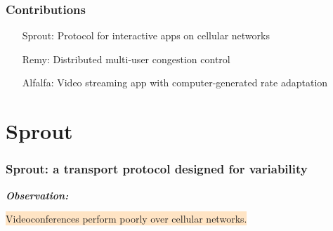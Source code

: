 \documentclass[svgnames]{beamer}
\begin{document}
\begin{frame}
\frametitle{Contributions}

\begin{itemize}

\item[Sprout:] Protocol for interactive apps on cellular networks


\item[]

\item[Remy:] Distributed multi-user congestion control



%
%

\item[]

\item[Alfalfa:] Video streaming app with computer-generated rate adaptation


\end{itemize}

\end{frame}

\section{Sprout}

\begin{frame}
\frametitle{Sprout: a transport protocol designed for variability}

\large

\textit{\bf Observation:}

\hspace{10 pt} \colorbox{Bisque}{Videoconferences perform poorly over cellular networks.}

\vspace{\baselineskip}

\end{frame}
\end{document}
